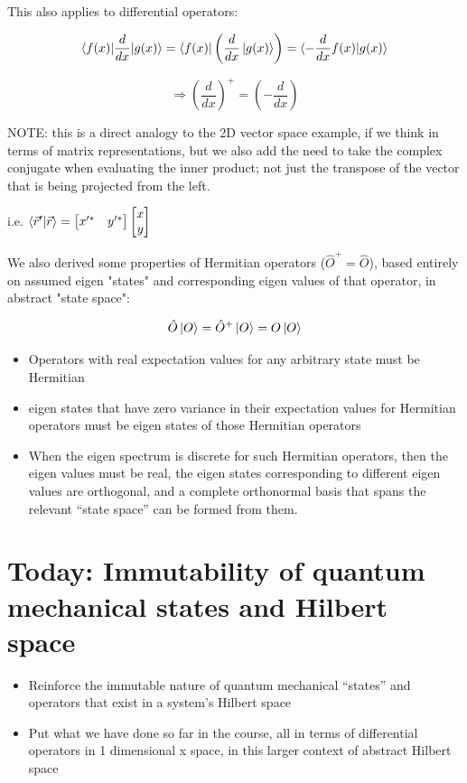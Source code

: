 \documentclass{article}
\begin{document}
This also applies to differential operators:

$$\braket{f(x) | \frac{d}{dx} | g(x)} = \bra{f(x)} \left( \frac{d}{dx} \ket{g(x)} \right) = \braket{- \frac{d}{dx} f(x) | g(x)}$$

$$\Rightarrow \left( \frac{d}{dx} \right)^+ = \left( - \frac{d}{dx} \right)$$

NOTE: this is a direct analogy to the 2D vector space example, if we think in terms of matrix representations, but we also add the need to take the complex conjugate when evaluating the inner product; not just the transpose of the vector that is being projected from the left. 

i.e. $\braket{\vec{r}'|\vec{r}} = \begin{bmatrix} x'^* & y'^* \end{bmatrix} \begin{bmatrix} x\\ y \end{bmatrix}$

We also derived some properties of Hermitian operators ($\hat{O}^+ = \hat{O}$), based entirely on assumed eigen "states" and corresponding eigen values of that operator, in abstract "state space":

$$\hat{O} \ket{O} = \hat{O}^+ \ket{O} = O \ket{O}$$

\begin{itemize}
    \item Operators with real expectation values for any arbitrary state must be Hermitian
    \item eigen states that have zero variance in their expectation values for Hermitian operators must be eigen states of those Hermitian operators
    \item When the eigen spectrum is discrete for such Hermitian operators, then the eigen values must be real, the eigen states corresponding to different eigen values are orthogonal, and a complete orthonormal basis that spans the relevant “state space” can be formed from them.
\end{itemize}

\section{Today: Immutability of quantum mechanical states and Hilbert space}


\begin{itemize}
    \item Reinforce the immutable nature of quantum mechanical “states” and operators that exist in a system’s Hilbert space
    \item Put what we have done so far in the course, all in terms of differential operators in 1 dimensional x space, in this larger context of abstract Hilbert space
\end{itemize}
\end{document}
